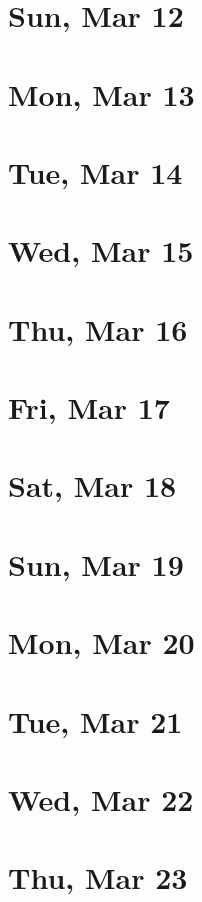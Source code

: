 	\section{Sun, Mar 12}
		
	\section{Mon, Mar 13}
		
	\section{Tue, Mar 14}
		
	\section{Wed, Mar 15}
		
	\section{Thu, Mar 16}
		
	\section{Fri, Mar 17}
		
	\section{Sat, Mar 18}
		
	\section{Sun, Mar 19}
		
	\section{Mon, Mar 20}
		
	\section{Tue, Mar 21}
		
	\section{Wed, Mar 22}
		
	\section{Thu, Mar 23}
		
